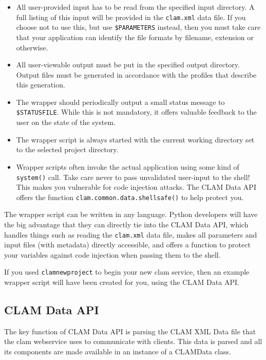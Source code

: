 \documentclass[a4paper,12pt,twoside,openright]{report}
\begin{document}
\begin{itemize}
\item All user-provided input has to be read from the specified input directory. A full listing of this input will be provided in the \texttt{clam.xml} data file. If you choose not to use this, but use \texttt{\$PARAMETERS} instead, then you must take care that your application can identify the file formats by filename, extension or otherwise.
\item All user-viewable output must be put in the specified output directory. Output files must be generated in accordance with the profiles that describe this generation. 
\item The wrapper should periodically output a small status message to
  \texttt{\$STATUSFILE}. While this is not mandatory, it offers valuable feedback to the user on the state of the system. 
\item The wrapper script is always started with the current working directory set to the selected project directory.
\item Wrapper scripts often invoke the actual application using some kind of
  \texttt{system()} call. Take care never to pass unvalidated user-input to the shell! This makes you vulnerable
  for code injection attacks. The CLAM Data API offers the function
  \texttt{clam.common.data.shellsafe()} to help protect you.
\end{itemize}

The wrapper script can be written in any language. Python developers will have
the big advantage that they can directly tie into the CLAM Data API, which
handles things such as reading the \texttt{clam.xml} data file, makes all
parameters and input files (with metadata) directly accessible, and offers a
function to protect your variables against code injection when passing them to
the shell.

If you used \texttt{clamnewproject} to begin your new clam service, then an example
wrapper script will have been created for you, using the CLAM Data API.

\subsection{CLAM Data API}

The key function of CLAM Data API is parsing the CLAM XML Data file that the
clam webservice uses to communicate with clients. This data is parsed and all
its components are made available in an instance of a CLAMData class.
\end{document}
